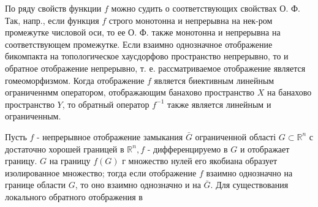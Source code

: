 \documentclass[10pt]{article}
\begin{document}
По ряду свойств функции $f$ можно судить о соответствующих свойствах О. Ф. Так, напр., если функция $f$ строго монотонна и непрерывна на нек-ром промежутке числовой оси, то ее О. Ф. также монотонна и непрерывна на соответствующем промежутке. Если взаимно однозначное отображение бикомпакта на топологическое хаусдорфово пространство непрерывно, то и обратное отображение непрерывно, т. е. рассматриваемое отображение является гомеоморфизмом. Когда отображение $f$ является биективным линейным ограниченнмм оператором, отображающим банахово пространство $X$ на банахово пространство $Y$, то обратный оператор $f^{-1}$ также является линейным и ограниченным.



Пусть $f$ - непрерывное отображение замыкания $\bar{G}$ ограниченной області $G \subset \mathbb{R}^{n}$ с достаточно хорошей границей в $\mathbb{R}^{n}, f$ - дифференцируемо в $G$ и отображает границу. $G$ на границу $f(G)$ г множество нулей его якобиана образует изолированное множество; тогда если отображение $f$ взаимно однозначно на границе области $G$, то оно взаимно однозначно и на $\bar{G}$. Для существования локального обратного отображения в
\end{document}
